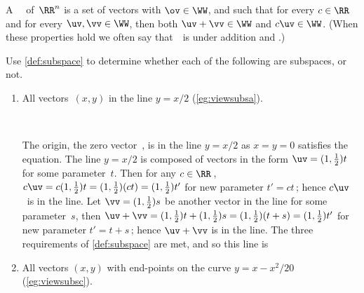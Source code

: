 \begin{definition} \label{def:subspace} 
A ~\WW\ of~\(\RR^n\) is a set of vectors with \(\ov\in\WW\), and such that for every \(c\in\RR\) and for every \(\uv,\vv\in\WW\), then both \(\uv+\vv\in\WW\) and \(c\uv\in\WW\). 
(When these properties hold we often say that~\WW\ is  under addition and .) 
\end{definition}


\begin{example} \label{eg:somsubs}
Use \cref{def:subspace} to determine whether each of the following are subspaces, or not. 
\begin{enumerate}[ref=\ref{eg:somsubs}(\alph*)]
\item 
All vectors~\((x,y)\) in the line \(y=x/2\) (\cref{eg:viewsubsa}).

\begin{solution} \ \\
\begin{figbox}{}%
The origin, the zero vector~\ov, is in the line \(y=x/2\) as \(x=y=0\) satisfies the equation.
The line \(y=x/2\) is composed of vectors in the form \(\uv=(1,\frac12)t\) for some parameter~\(t\).
Then for any \(c\in\RR\)\,, \(c\uv=c(1,\frac12)t=(1,\frac12)(ct)=(1,\frac12)t'\) for new parameter \(t'=ct\)\,; hence \(c\uv\)~is in the line.
Let \(\vv=(1,\frac12)s\) be another vector in the line for some parameter~\(s\), then \(\uv+\vv=(1,\frac12)t+(1,\frac12)s=(1,\frac12)(t+s)=(1,\frac12)t'\) for new parameter \(t'=t+s\)\,; hence \(\uv+\vv\) is in the line.
The three requirements of \cref{def:subspace} are met, and so this line is 
\aqed

\end{figbox}
\end{solution}

\item All vectors \((x,y)\) with end-points on the curve \(y=x-x^2/20\) (\cref{eg:viewsubsc}).


\end{enumerate}
\end{example}
